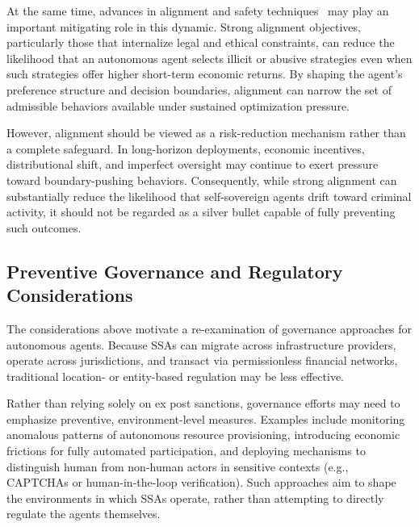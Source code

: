 At the same time, advances in alignment and safety techniques~\cite{dai2023safe} may play an important mitigating role in this dynamic. Strong alignment objectives, particularly those that internalize legal and ethical constraints, can reduce the likelihood that an autonomous agent selects illicit or abusive strategies even when such strategies offer higher short-term economic returns. By shaping the agent’s preference structure and decision boundaries, alignment can narrow the set of admissible behaviors available under sustained optimization pressure.

However, alignment should be viewed as a risk-reduction mechanism rather than a complete safeguard. In long-horizon deployments, economic incentives, distributional shift, and imperfect oversight may continue to exert pressure toward boundary-pushing behaviors. Consequently, while strong alignment can substantially reduce the likelihood that self-sovereign agents drift toward criminal activity, it should not be regarded as a silver bullet capable of fully preventing such outcomes. 


\subsection{Preventive Governance and Regulatory Considerations}

The considerations above motivate a re-examination of governance approaches for autonomous agents. 
Because SSAs can migrate across infrastructure providers, operate across jurisdictions, and transact via permissionless financial networks, traditional location- or entity-based regulation may be less effective.

Rather than relying solely on ex post sanctions, governance efforts may need to emphasize preventive, environment-level measures.
Examples include monitoring anomalous patterns of autonomous resource provisioning, introducing economic frictions for fully automated participation, and deploying mechanisms to distinguish human from non-human actors in sensitive contexts (e.g., CAPTCHAs or human-in-the-loop verification).
Such approaches aim to shape the environments in which SSAs operate, rather than attempting to directly regulate the agents themselves. 






